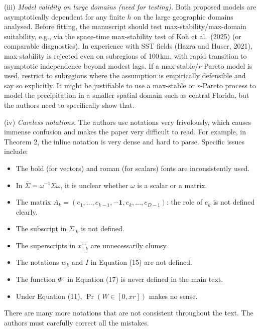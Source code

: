 \documentclass[12pt
]{article}
\begin{document}
\begin{Comments}
(iii) \emph{Model validity on large domains (need for testing).} Both proposed models are asymptotically dependent for any finite $h$ on the large geographic domains analysed. Before fitting, the manuscript should test max-stability/max-domain suitability, e.g., via the space-time max-stability test of Koh et al.\ (2025) (or comparable diagnostics). In experience with SST fields (Hazra and Huser, 2021), max-stability is rejected even on subregions of 100\,km, with rapid transition to asymptotic independence beyond modest lags. If a max-stable/$r$-Pareto model is used, restrict to subregions where the assumption is empirically defensible and say so explicitly. It might be justifiable to use a max-stable or $r$-Pareto process to model the precipitation in a smaller spatial domain such as central Florida, but the authors need to specifically show that.
\end{Comments}

\begin{Res}
\end{Res}

\begin{Comments}
(iv) \emph{Careless notations.} The authors use notations very frivolously, which causes immense confusion and makes the paper very difficult to read. For example, in Theorem 2, the inline notation is very dense and hard to parse. Specific issues include:
\begin{itemize}
  \item The bold (for vectors) and roman (for scalars) fonts are inconsistently used.
  \item In $\bar{\Sigma} = \omega^{-1}\Sigma\omega$, it is unclear whether $\omega$ is a scalar or a matrix.
  \item The matrix $A_k = (e_1,\ldots,e_{k-1},-\mathbf{1},e_k,\ldots,e_{D-1})$: the role of $e_k$ is not defined clearly.
  \item The subscript in $\Sigma_{\cdot k}$ is not defined.
  \item The superscripts in $x_{-k}^{\circ\circ}$ are unnecessarily clumsy.
  \item The notations $w_k$ and $I$ in Equation (15) are not defined.
  \item The function $\Phi^\circ$ in Equation (17) is never defined in the main text.
  \item Under Equation (11), $\Pr(W \in [0, xr])$ makes no sense.
\end{itemize}
There are many more notations that are not consistent throughout the text. The authors must carefully correct all the mistakes.
\end{Comments}
\end{document}
